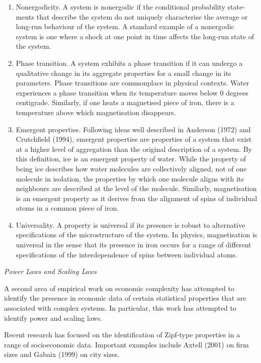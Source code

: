 \documentclass[
]{book}
\begin{document}
\begin{enumerate}
\def\labelenumi{(\roman{enumi})}
\item
  Nonergodicity. A system is nonergodic if the conditional probability state-
  ments that describe the system do not uniquely characterise the average or
  long-run behaviour of the system. A standard example of a nonergodic
  system is one where a shock at one point in time affects the long-run state of
  the system.
\item
  Phase transition. A system exhibits a phase transition if it can undergo a
  qualitative change in its aggregate properties for a small change in its
  parameters. Phase transitions are commonplace in physical contexts. Water
  experiences a phase transition when its temperature moves below 0 degrees
  centigrade. Similarly, if one heats a magnetised piece of iron, there is a
  temperature above which magnetisation disappears.
\item
  Emergent properties. Following ideas well described in Anderson (1972) and
  Crutchfield (1994), emergent properties are properties of a system that
  exist at a higher level of aggregation than the original description of a
  system. By this definition, ice is an emergent property of water. While the
  property of being ice describes how water molecules are collectively
  aligned, not of one molecule in isolation, the properties by which one
  molecule aligns with its neighbours are described at the level of the
  molecule. Similarly, magnetisation is an emergent property as it derives
  from the alignment of spins of individual atoms in a common piece of iron.
\item
  Universality. A property is universal if its presence is robust to alternative
  specifications of the microstructure of the system. In physics, magnetisation
  is universal in the sense that its presence in iron occurs for a range of
  different specifications of the interdependence of spins between individual
  atoms.
\end{enumerate}

\emph{Power Laws and Scaling Laws}

A second area of empirical work on economic complexity has attempted to identify
the presence in economic data of certain statistical properties that are associated
with complex systems. In particular, this work has attempted to identify power and
scaling laws.

Recent research has focused on the
identification of Zipf-type properties in a range of socioeconomic data. Important
examples include Axtell (2001) on firm sizes and Gabaix (1999) on city sizes.
\end{document}
